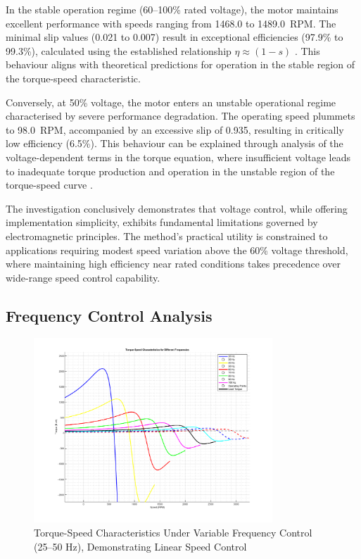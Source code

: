 \documentclass[a4paper,12pt]{article}
\begin{document}
In the stable operation regime (60--100\% rated voltage), the motor maintains excellent performance with speeds ranging from 1468.0 to 1489.0~RPM. The minimal slip values (0.021 to 0.007) result in exceptional efficiencies (97.9\% to 99.3\%), calculated using the established relationship $\eta \approx (1-s)$ \cite{Sen2014}. This behaviour aligns with theoretical predictions for operation in the stable region of the torque-speed characteristic.

Conversely, at 50\% voltage, the motor enters an unstable operational regime characterised by severe performance degradation. The operating speed plummets to 98.0~RPM, accompanied by an excessive slip of 0.935, resulting in critically low efficiency (6.5\%). This behaviour can be explained through analysis of the voltage-dependent terms in the torque equation, where insufficient voltage leads to inadequate torque production and operation in the unstable region of the torque-speed curve \cite{fitzgerald2020}.

The investigation conclusively demonstrates that voltage control, while offering implementation simplicity, exhibits fundamental limitations governed by electromagnetic principles. The method's practical utility is constrained to applications requiring modest speed variation above the 60\% voltage threshold, where maintaining high efficiency near rated conditions takes precedence over wide-range speed control capability.

\subsection{Frequency Control Analysis}
\begin{figure}[htbp]
    \centering
    \includegraphics[width=0.8\textwidth]{speed.png}
    \caption{Torque-Speed Characteristics Under Variable Frequency Control (25--50 Hz), Demonstrating Linear Speed Control}
    \label{fig:frequency_control}
\end{figure}
\end{document}
